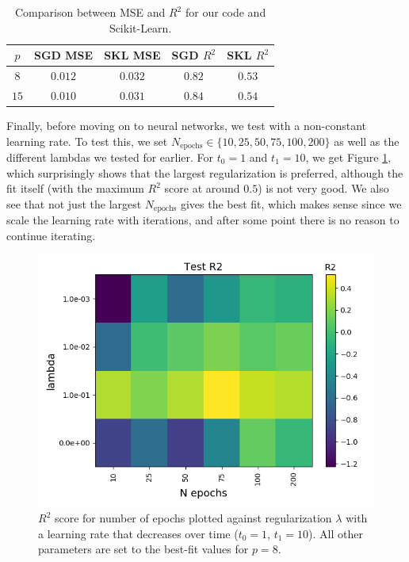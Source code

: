 \documentclass[a4paper]{article}
\newcommand{\Nepochs}{N_{\text{epochs}}}
\begin{document}
\begin{table}[H]
  \centering
  \caption{Comparison between MSE and $R^2$ for our code and Scikit-Learn.}
  \label{tab:sgd_franke_skl}
  \begin{tabular}{c|c|c|c|c}
    \hline\hline
    $p$ & SGD MSE & SKL MSE & SGD $R^2$ & SKL $R^2$\\\hline
	$8$ & $0.012$ & $0.032$ & $0.82$ & $0.53$\\
	$15$& $0.010$ & $0.031$ & $0.84$ & $0.54$
    \end{tabular}
\end{table}
Finally, before moving on to neural networks, we test with a non-constant learning rate. To test this, we set $\Nepochs \in \{10, 25, 50, 75, 100, 200\}$ as well as the different lambdas we tested for earlier. For $t_0 = 1$ and $t_1 = 10$, we get Figure \ref{fig:sgd_5}, which surprisingly shows that the largest regularization is preferred, although the fit itself (with the maximum $R^2$ score at around $0.5$) is not very good. We also see that not just the largest $\Nepochs$ gives the best fit, which makes sense since we scale the learning rate with iterations, and after some point there is no reason to continue iterating.
\begin{figure}[H]
	\centering
	\includegraphics[scale=0.5]{../figures/task_a/non_constant_lr/heatmap_non_constant_lr_lr_optimal_Nhyp6114_R2_n_epochs_lambdas.png}
	\caption{$R^2$ score for number of epochs plotted against regularization $\lambda$ with a learning rate that decreases over time ($t_0 = 1$, $t_1=10$). All other parameters are set to the best-fit values for $p=8$.}
	\label{fig:sgd_5}
\end{figure}
\end{document}
